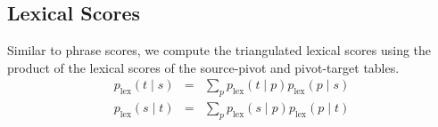 \documentclass[11pt]{article}
\begin{document}
\subsection{Lexical Scores}
\label{sec:lexical_scores}
	Similar to phrase scores, we compute the triangulated lexical scores using the product of the lexical scores of the source-pivot and pivot-target tables.   
	\begin{eqnarray}
        p_{\mathrm{lex}}(t \mid s) &=& \sum_{p} p_{\mathrm{lex}}(t \mid p) p_{\mathrm{lex}}(p \mid s) \\
        p_{\mathrm{lex}}(s \mid t) &=& \sum_{p} p_{\mathrm{lex}}(s \mid p) p_{\mathrm{lex}}(p \mid t)
	\end{eqnarray}
\end{document}
